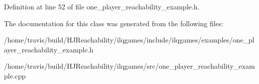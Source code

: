 Definition at line 52 of file one\+\_\+player\+\_\+reachability\+\_\+example.\+h.



The documentation for this class was generated from the following files\+:\begin{DoxyCompactItemize}
\item 
/home/travis/build/\+H\+J\+Reachability/ilqgames/include/ilqgames/examples/one\+\_\+player\+\_\+reachability\+\_\+example.\+h\item 
/home/travis/build/\+H\+J\+Reachability/ilqgames/src/one\+\_\+player\+\_\+reachability\+\_\+example.\+cpp\end{DoxyCompactItemize}
